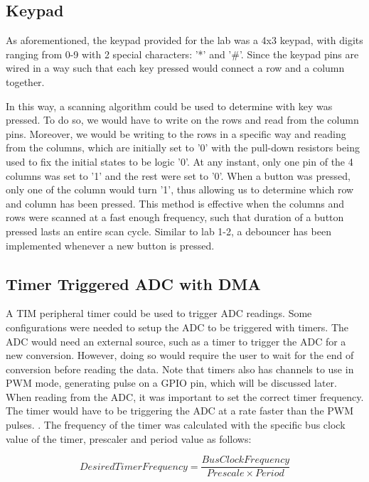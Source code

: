 \documentclass[a4paper,titlepage]{article}
\begin{document}
\subsection{Keypad}
As aforementioned, the keypad provided for the lab was a 4x3 keypad, with digits ranging from 0-9 with 2 special characters: '*' and '\#'. Since the keypad pins are wired in a way such that each key pressed would connect a row and a column together.

In this way, a scanning algorithm could be used to determine with key was pressed. To do so, we would have to write on the rows and read from the column pins. Moreover, we would be writing to the rows in a specific way and reading from the columns, which are initially set to '0' with the pull-down resistors being used to fix the initial states to be logic '0'. At any instant, only one pin of the 4 columns was set to '1' and the rest were set to '0'. When a button was pressed, only one of the column would turn '1', thus allowing us to determine which row and column has been pressed. This method is effective when the columns and rows were scanned at a fast enough frequency, such that duration of a button pressed lasts an entire scan cycle.
Similar to lab 1-2, a debouncer has been implemented whenever a new button is pressed.


\subsection{Timer Triggered ADC with DMA}
A TIM peripheral timer could be used to trigger ADC readings. Some configurations were needed to setup the ADC to be triggered with timers. The ADC would need an external source, such as a timer to trigger the ADC for a new conversion. However, doing so would require the user to wait for the end of conversion before reading the data. Note that timers also has channels to use in PWM mode, generating pulse on a GPIO pin, which will be discussed later. When reading from the ADC, it was important to set the correct timer frequency. The timer would have to be triggering the ADC at a rate faster than the PWM pulses.  . The frequency of the timer was calculated with the specific bus clock value of the timer, prescaler and period value as follows:

\begin{equation}
Desired Timer Frequency = \frac{Bus Clock Frequency}{Prescale \times Period }
\end{equation}
\end{document}
